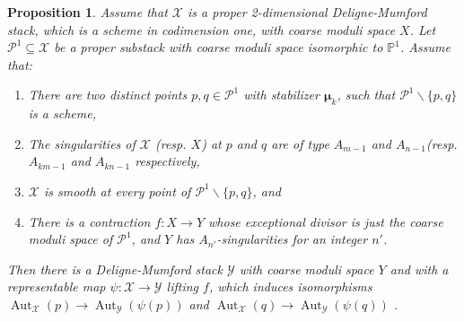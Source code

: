 \documentclass{amsart}
\newcommand{\bP}{\mathbb{P}}
\newcommand{\cP}{\mathcal{P}}
\newcommand{\cX}{\mathcal{X}}
\newcommand{\cY}{\mathcal{Y}}
\newcommand{\bmu}{\bm{\mu}}
\newtheorem{Prop}[theorem]{Proposition}
\theoremstyle{definition}
\begin{document}
\begin{Prop}\label{prop Artin contractions}
Assume that $\cX$ is a proper 2-dimensional Deligne-Mumford stack, which is a scheme in codimension one, with coarse moduli space $X$. Let $\cP^1\subseteq \cX$ be a proper substack with coarse moduli space isomorphic to $\bP^1$. Assume that:
\begin{enumerate}
\item There are two distinct points $p,q\in \cP^1$  with stabilizer $\bmu_k$, such that $\cP^1\smallsetminus \{p,q\}$ is a scheme,
\item The singularities of $\cX$ (resp. $X$) at $p$ and $q$ are of type $A_{m-1}$ and $A_{n-1}$(resp. $A_{km-1}$ and $A_{kn-1}$ respectively, 
\item $\cX$ is smooth at every point of $\cP^1\smallsetminus \{p,q\}$, and 
\item There is a contraction $f:X\to Y$ whose exceptional divisor is just the coarse moduli space of $\cP^1$, and $Y$ has $A_{n'}$-singularities for an integer $n'$.
\end{enumerate}
Then there is a Deligne-Mumford stack $\cY$ with coarse moduli space $Y$ and with a representable map $\psi:\cX\to \cY$ lifting $f$, which induces isomorphisms $\operatorname{Aut}_\cX(p)\to \operatorname{Aut}_\cY(\psi(p))$ and $\operatorname{Aut}_\cX(q)\to \operatorname{Aut}_\cY(\psi(q))$ .
\end{Prop}
\end{document}
